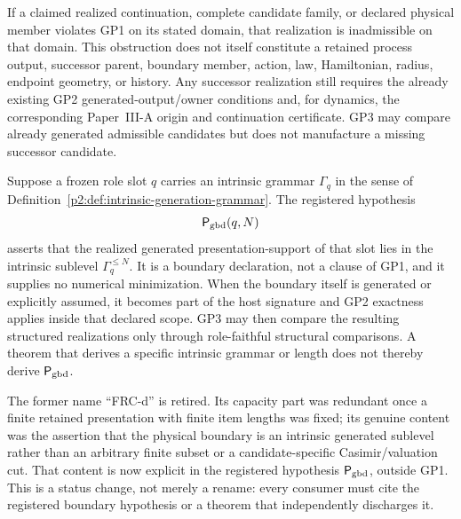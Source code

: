 \documentclass[12pt,a4paper]{article}
\begin{document}
\begin{remark}
\label{p2a:rem:gp1-obstruction-no-successor-constructor}
If a claimed realized continuation, complete candidate family, or declared
physical member violates GP1 on its stated domain, that realization is
inadmissible on that domain.  This obstruction does not itself constitute a
retained process output, successor parent, boundary member, action, law,
Hamiltonian, radius, endpoint geometry, or history.  Any successor
realization still requires the already existing GP2 generated-output/owner
conditions and, for dynamics, the corresponding Paper~III-A origin and
continuation certificate.  GP3 may compare already generated admissible
candidates but does not manufacture a missing successor candidate.
\end{remark}

\begin{definition}
\label{p2:def:generated-boundary-hypothesis}
Suppose a frozen role slot \(q\) carries an intrinsic grammar \(\Gamma_q\) in
the sense of Definition~\ref{p2:def:intrinsic-generation-grammar}.  The
registered hypothesis
\[
 \mathsf P_{\rm gbd}(q,N)
\]
asserts that the realized generated presentation-support of that slot lies in
the intrinsic sublevel \(\Gamma_q^{\le N}\).  It is a boundary declaration,
not a clause of GP1, and it supplies no numerical minimization.  When the
boundary itself is generated or explicitly assumed, it becomes part of the
host signature and GP2 exactness applies inside that declared scope.  GP3 may
then compare the resulting structured realizations only through role-faithful
structural comparisons.  A theorem that derives a specific
intrinsic grammar or length does not thereby derive \(\mathsf P_{\rm gbd}\).
\end{definition}

\begin{remark}
\label{p2:rem:frcd-boundary-semantics}
The former name ``FRC-d'' is retired.  Its capacity part was redundant once a
finite retained presentation with finite item lengths was fixed; its genuine
content was the assertion that the physical boundary is an intrinsic generated
sublevel rather than an arbitrary finite subset or a candidate-specific
Casimir/valuation cut.  That content is now explicit in the registered
hypothesis \(\mathsf P_{\rm gbd}\), outside GP1.  This is a status change, not
merely a rename: every consumer must cite the registered boundary hypothesis
or a theorem that independently discharges it.
\end{remark}
\end{document}
